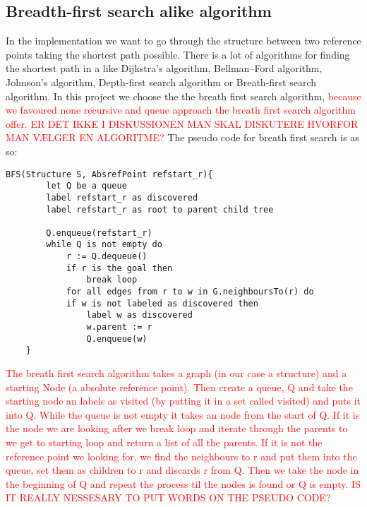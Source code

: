     \subsection{Breadth-first search alike algorithm}
    In the implementation we want to go through the structure between two reference points taking the shortest path possible. There is a lot of algorithms for finding the shortest path in a like Dijkstra's algorithm, Bellman–Ford algorithm, Johnson's algorithm, Depth-first search algorithm or Breath-first search algorithm. In this project we choose the the breath first search algorithm, \textcolor{red}{because we favoured none recursive and queue approach the breath first search algorithm offer. ER DET IKKE I DISKUSSIONEN MAN SKAL DISKUTERE HVORFOR MAN VÆLGER EN ALGORITME?} The pseudo code for breath first search is as so: 
    \begin{lstlisting}[caption={Pseudo code for breath first search algorithm},label ={lst:breathfirstsearchalgorithm},language= pseudo, frame = single]
    BFS(Structure S, AbsrefPoint refstart_r){
        let Q be a queue
        label refstart_r as discovered
        label refstart_r as root to parent child tree
        
        Q.enqueue(refstart_r)
        while Q is not empty do
            r := Q.dequeue()
            if r is the goal then
                break loop
            for all edges from r to w in G.neighboursTo(r) do
            if w is not labeled as discovered then
                label w as discovered
                w.parent := r
                Q.enqueue(w)
    }
    \end{lstlisting}
    \textcolor{red}{The breath first search algorithm takes a graph (in our case a structure) and a starting Node (a absolute reference point). Then create a queue, Q and take the starting node an labels as visited (by putting it in a set called visited) and puts it into Q. While the queue is not empty it takes an node from the start of Q. If it is the node we are looking after we break loop and iterate through the parents to we get to starting loop and return a list of all the parents. If it is not the reference point we looking for, we find the neighbours to r and put them into the queue, set them as children to r and discards r from Q. Then we take the node in the beginning of Q and repeat the process til the nodes is found or Q is empty. IS IT REALLY NESSESARY TO PUT WORDS ON THE PSEUDO CODE?}\\\\
